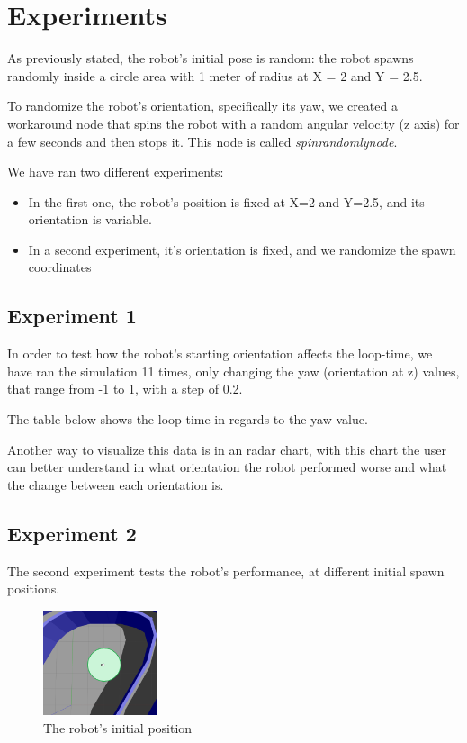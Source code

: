 \documentclass[conference]{IEEEtran}
\begin{document}
\section{Experiments}

As previously stated, the robot's initial pose is random: the robot spawns randomly inside a circle area
with 1 meter of radius at X = 2 and Y = 2.5.

To randomize the robot's orientation, specifically its yaw, we created a workaround node that spins the robot
with a random angular velocity (z axis) for a few seconds and then stops it.
This node is called \emph{spin\textunderscore randomly\textunderscore node}.

We have ran two different experiments:
\begin{itemize}
    \item In the first one, the robot's position is fixed at X=2 and Y=2.5, and its orientation is variable.
    \item In a second experiment, it's orientation is fixed, and we randomize the spawn coordinates
\end{itemize}

\subsection{Experiment 1}

In order to test how the robot's starting orientation affects the loop-time, we have ran the simulation 11 times, only changing the yaw (orientation at z) values, that range from -1 to 1, with a step of 0.2.

The table below shows the loop time in regards to the yaw value.


Another way to visualize this data is in an radar chart, with this chart the user can better understand in what orientation the robot performed worse and what the change  between each orientation is. 

\subsection{Experiment 2}

The second experiment tests the robot's performance, at different initial spawn positions.

\begin{figure}[h]
    \centering
    \includegraphics[width=0.3\textwidth]{images/spawn-positions.png}
    \caption{The robot's initial position}
    \label{fig:initial-position}
\end{figure}
\end{document}

